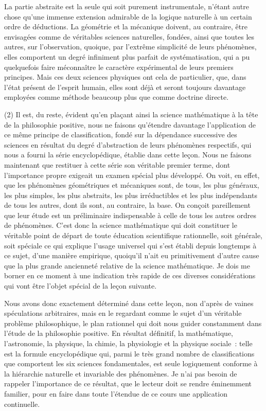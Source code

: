 \documentclass[french,twoside]{book} %
\begin{document}
La partie abstraite est la seule qui soit purement instrumentale, n’étant autre chose qu’une immense extension admirable de la logique naturelle à un certain ordre de déductions. La géométrie et la mécanique doivent, au contraire, être envisagées comme de véritables sciences naturelles, fondées, ainsi que toutes les autres, sur l’observation, quoique, par l’extrême simplicité de leurs phénomènes, elles comportent un degré infiniment plus parfait de systématisation, qui a pu quelquefois faire méconnaître le caractère expérimental de leurs premiers principes. Mais ces deux sciences physiques ont cela de particulier, que, dans l’état présent de l’esprit humain, elles sont déjà et seront toujours davantage employées comme méthode beaucoup plus que comme doctrine directe.\par
(2) Il est, du reste, évident qu’en plaçant ainsi la science mathématique à la tête de la philosophie positive, nous ne faisons qu’étendre davantage l’application de ce même principe de classification, fondé sur la dépendance successive des sciences en résultat du degré d’abstraction de leurs phénomènes respectifs, qui nous a fourni la série encyclopédique, établie dans cette leçon. Nous ne faisons maintenant que restituer à cette série son véritable premier terme, dont l’importance propre exigeait un examen spécial plus développé. On voit, en effet, que les phénomènes géométriques et mécaniques sont, de tous, les plus généraux, les plus simples, les plus abstraits, les plus irréductibles et les plus indépendants de tous les autres, dont ils sont, au contraire, la base. On conçoit pareillement que leur étude est un préliminaire indispensable à celle de tous les autres ordres de phénomènes. C’est donc la science mathématique qui doit constituer le véritable point de départ de toute éducation scientifique rationnelle, soit générale, soit spéciale ce qui explique l’usage universel qui s’est établi depuis longtemps à ce sujet, d’une manière empirique, quoiqu’il n’ait eu primitivement d’autre cause que la plus grande ancienneté relative de la science mathématique. Je dois me borner en ce moment à une indication très rapide de ces diverses considérations qui vont être l’objet spécial de la leçon suivante.\par
Nous avons donc exactement déterminé dans cette leçon, non d’après de vaines spéculations arbitraires, mais en le regardant comme le sujet d’un véritable problème philosophique, le plan rationnel qui doit nous guider constamment dans l’étude de la philosophie positive. En résultat définitif, la mathématique, l’astronomie, la physique, la chimie, la physiologie et la physique sociale : telle est la formule encyclopédique qui, parmi le très grand nombre de classifications que comportent les six sciences fondamentales, est seule logiquement conforme à la hiérarchie naturelle et invariable des phénomènes. Je n’ai pas besoin de rappeler l’importance de ce résultat, que le lecteur doit se rendre éminemment familier, pour en faire dans toute l’étendue de ce cours une application continuelle.\par
\end{document}
